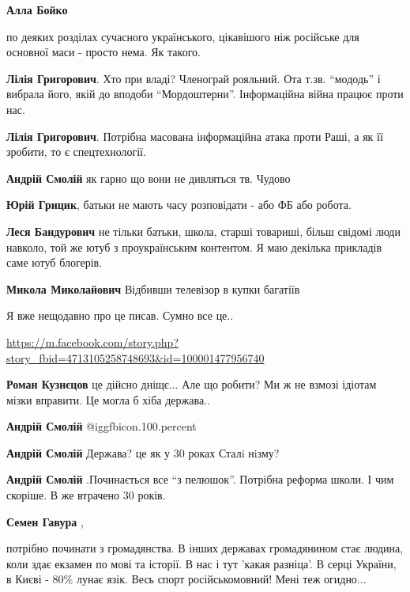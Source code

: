 \begin{itemize}
\begin{itemize}
\textbf{Алла Бойко} 

по деяких розділах сучасного українського, цікавішого ніж російське для
основної маси - просто нема. Як такого.

\textbf{Лілія Григорович}. Хто при владі? Членограй рояльний.
Ота т.зв. \enquote{мододь} і вибрала його, якій до вподоби \enquote{Мордоштерни}.
Інформаційна війна працює проти нас.

\textbf{Лілія Григорович}. Потрібна масована інформаційна атака проти Раші, а як її зробити, то є спецтехнології.

\textbf{Андрій Смолій} як гарно що вони не дивляться тв. Чудово

\textbf{Юрій Грицик}, батьки не мають часу розповідати - або ФБ або робота.

\textbf{Леся Бандурович} не тільки батьки, школа, старші товариші, більш свідомі люди навколо, той же ютуб з проукраїнським контентом. Я маю декілька прикладів саме ютуб блогерів.

\textbf{Микола Миколайович} Відбивши телевізор в купки багатіїв
\end{itemize} %


Я вже нещодавно про це писав. Сумно все це..

\url{https://m.facebook.com/story.php?story_fbid=4713105258748693&id=100001477956740}

\begin{itemize} %
\textbf{Роман Кузнєцов} це дійсно дніщє...
Але що робити? Ми ж не взмозі ідіотам мізки вправити. Це могла б хіба держава..

\textbf{Андрій Смолій}  @igg{fbicon.100.percent} 

\textbf{Андрій Смолій} Держава? це як у 30 роках Сталi нiзму?

\textbf{Андрій Смолій} .Починається все \enquote{з пелюшок}. Потрібна реформа школи. І чим скоріше. В же втрачено 30 років.

\textbf{Семен Гавура} , 

потрібно починати з громадянства. В інших державах громадянином стає людина,
коли здає екзамен по мові та історії. В нас і тут 'какая разніца'. В серці
України, в Києві - 80\% лунає язік. Весь спорт російськомовний! Мені теж
огидно...


\end{itemize}
\end{itemize}
